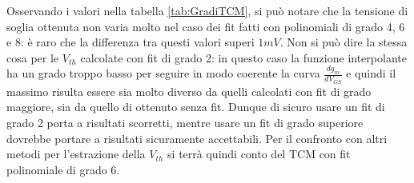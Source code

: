 \documentclass[12pt, letterpaper]{book}
\begin{document}
Osservando i valori nella tabella \ref{tab:GradiTCM}, si può notare che la tensione di soglia ottenuta non varia molto nel caso dei fit fatti con polinomiali di grado 4, 6 e 8: è raro che la differenza tra questi valori superi $1 mV$. Non si può dire la stessa cosa per le $V_{th}$ calcolate con fit di grado 2: in questo caso la funzione interpolante ha un grado troppo basso per seguire in modo coerente la curva $\frac{dg_m}{dV_{GS}}$ e quindi il massimo risulta essere sia molto diverso da quelli calcolati con fit di grado maggiore, sia da quello di ottenuto senza fit. Dunque di sicuro usare un fit di grado 2 porta a risultati scorretti, mentre usare un fit di grado superiore dovrebbe portare a risultati sicuramente accettabili. Per il confronto con altri metodi per l'estrazione della $V_{th}$ si terrà quindi conto del TCM con fit polinomiale di grado 6.
\end{document}
